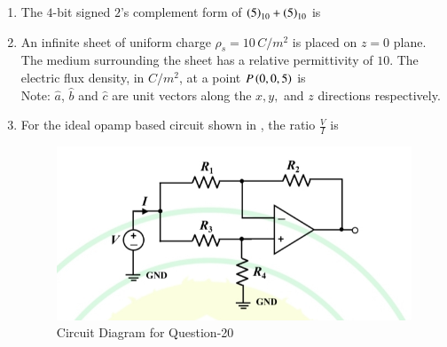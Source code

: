 \documentclass[journal,12pt,onecolumn]{IEEEtran}
\theoremstyle{remark}
\begin{document}
\begin{enumerate}
\item The $4$-bit signed $2$'s complement form of $\left(5\right)_{10} + \left(5\right)_{10}$ is \par\hfill{}
\begin{enumerate}
\end{enumerate}

\item An infinite sheet of uniform charge $\rho_s = 10 \, C/m^2$ is placed on $z=0$ plane.  
The medium surrounding the sheet has a relative permittivity of $10$.  
The electric flux density, in $C/m^2$, at a point $P\left(0,0,5\right)$ is\\
Note: $\hat{a}$, $\hat{b}$ and $\hat{c}$ are unit vectors along the $x, y,$ and $z$ directions respectively. \par\hfill{}
\begin{enumerate}
\end{enumerate}

\item For the ideal opamp based circuit shown in , the ratio $\frac{V}{I}$ is \par\hfill{}
\begin{figure}[H]
    \centering
    \includegraphics[width=0.5\columnwidth]{Figs/Q-20.jpg}
    \caption{Circuit Diagram for Question-20}
    \label{20}
\end{figure}
\begin{enumerate}
\end{enumerate}


\end{enumerate}
\end{document}
